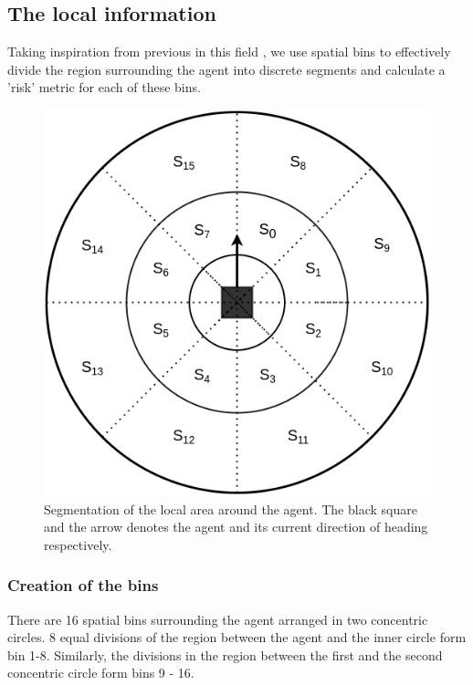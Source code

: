 \subsection*{The local information}
Taking inspiration from previous  in this field \cite{fahad_learning_2018} \cite{vasquez_inverse_2014}, we use spatial bins to effectively divide the region surrounding the agent into discrete segments and calculate a 'risk' metric for each of these bins.
    \begin{figure}[htbp]
	\centering
	\includegraphics[width=0.5\linewidth]{figures/risk_features_spatial_bins.png}
	\caption{Segmentation of the local area around the agent. The black square and the arrow denotes the agent and its current direction of heading respectively.}
	\label{fig:risk_local_bins}
\end{figure}
\subsubsection*{Creation of the bins}
There are 16 spatial bins surrounding the agent arranged in two concentric circles. 8 equal divisions of the region between the agent and the inner circle form bin 1-8. Similarly, the divisions in the region between the first and the second concentric circle form bins 9 - 16.
